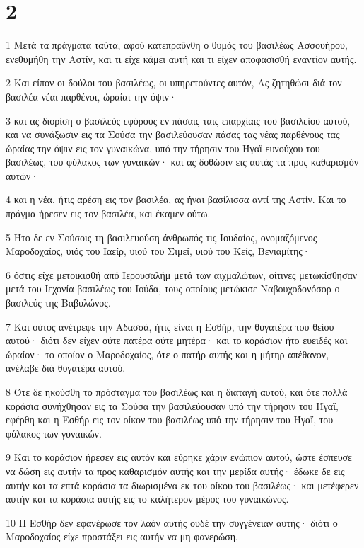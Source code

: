 \chapter{2}

\par 1 Μετά τα πράγματα ταύτα, αφού κατεπραΰνθη ο θυμός του βασιλέως Ασσουήρου, ενεθυμήθη την Αστίν, και τι είχε κάμει αυτή και τι είχεν αποφασισθή εναντίον αυτής.
\par 2 Και είπον οι δούλοι του βασιλέως, οι υπηρετούντες αυτόν, Ας ζητηθώσι διά τον βασιλέα νέαι παρθένοι, ώραίαι την όψιν·
\par 3 και ας διορίση ο βασιλεύς εφόρους εν πάσαις ταις επαρχίαις του βασιλείου αυτού, και να συνάξωσιν εις τα Σούσα την βασιλεύουσαν πάσας τας νέας παρθένους τας ώραίας την όψιν εις τον γυναικώνα, υπό την τήρησιν του Ήγαϊ ευνούχου του βασιλέως, του φύλακος των γυναικών· και ας δοθώσιν εις αυτάς τα προς καθαρισμόν αυτών·
\par 4 και η νέα, ήτις αρέση εις τον βασιλέα, ας ήναι βασίλισσα αντί της Αστίν. Και το πράγμα ήρεσεν εις τον βασιλέα, και έκαμεν ούτω.
\par 5 Ήτο δε εν Σούσοις τη βασιλευούση άνθρωπός τις Ιουδαίος, ονομαζόμενος Μαροδοχαίος, υιός του Ιαείρ, υιού του Σιμεΐ, υιού του Κείς, Βενιαμίτης·
\par 6 όστις είχε μετοικισθή από Ιερουσαλήμ μετά των αιχμαλώτων, οίτινες μετωκίσθησαν μετά του Ιεχονία βασιλέως του Ιούδα, τους οποίους μετώκισε Ναβουχοδονόσορ ο βασιλεύς της Βαβυλώνος.
\par 7 Και ούτος ανέτρεφε την Αδασσά, ήτις είναι η Εσθήρ, την θυγατέρα του θείου αυτού· διότι δεν είχεν ούτε πατέρα ούτε μητέρα· και το κοράσιον ήτο ευειδές και ώραίον· το οποίον ο Μαροδοχαίος, ότε ο πατήρ αυτής και η μήτηρ απέθανον, ανέλαβε διά θυγατέρα αυτού.
\par 8 Ότε δε ηκούσθη το πρόσταγμα του βασιλέως και η διαταγή αυτού, και ότε πολλά κοράσια συνήχθησαν εις τα Σούσα την βασιλεύουσαν υπό την τήρησιν του Ήγαϊ, εφέρθη και η Εσθήρ εις τον οίκον του βασιλέως υπό την τήρησιν του Ήγαϊ, του φύλακος των γυναικών.
\par 9 Και το κοράσιον ήρεσεν εις αυτόν και εύρηκε χάριν ενώπιον αυτού, ώστε έσπευσε να δώση εις αυτήν τα προς καθαρισμόν αυτής και την μερίδα αυτής· έδωκε δε εις αυτήν και τα επτά κοράσια τα διωρισμένα εκ του οίκου του βασιλέως· και μετέφερεν αυτήν και τα κοράσια αυτής εις το καλήτερον μέρος του γυναικώνος.
\par 10 Η Εσθήρ δεν εφανέρωσε τον λαόν αυτής ουδέ την συγγένειαν αυτής· διότι ο Μαροδοχαίος είχε προστάξει εις αυτήν να μη φανερώση.
